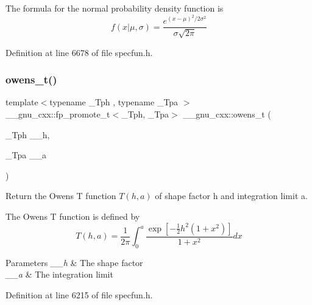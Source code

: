 The formula for the normal probability density function is \[ f(x|\mu,\sigma) = \frac{e^{(x-\mu)^2/2\sigma^2}}{\sigma\sqrt{2\pi}} \] 

Definition at line 6678 of file specfun.\+h.

\mbox{\label{group__mathsf__gnu_gab4e367aae19853cca3af99eead01fcaa}} 
\subsubsection{\texorpdfstring{owens\+\_\+t()}{owens\_t()}}
{\footnotesize\ttfamily template$<$typename \+\_\+\+Tph , typename \+\_\+\+Tpa $>$ \\
\+\_\+\+\_\+gnu\+\_\+cxx\+::fp\+\_\+promote\+\_\+t$<$\+\_\+\+Tph, \+\_\+\+Tpa$>$ \+\_\+\+\_\+gnu\+\_\+cxx\+::owens\+\_\+t (\begin{DoxyParamCaption}\item[{\+\_\+\+Tph}]{\+\_\+\+\_\+h,  }\item[{\+\_\+\+Tpa}]{\+\_\+\+\_\+a }\end{DoxyParamCaption})\hspace{0.3cm}{\ttfamily [inline]}}

Return the Owens T function $ T(h,a) $ of shape factor {\ttfamily h} and integration limit {\ttfamily a}.

The Owens T function is defined by \[ T(h,a) = \frac{1}{2\pi}\int_0^a \frac{\exp\left[-\frac{1}{2}h^2(1+x^2)\right]}{1+x^2} dx \]


\begin{DoxyParams}{Parameters}
{\em \+\_\+\+\_\+h} & The shape factor \\
\hline
{\em \+\_\+\+\_\+a} & The integration limit \\
\hline
\end{DoxyParams}


Definition at line 6215 of file specfun.\+h.

\mbox{\label{group__mathsf__gnu_gac24d32e9b072c4953654d5559f992871}} 
